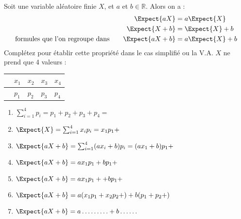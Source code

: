 \documentclass[main.tex]{subfiles}
\begin{document}
\begin{exercise} Soit une variable aléatoire finie $X$, et $a$ et $b\in\mathbb{R}$. Alors on a :
	\setlength{\abovedisplayskip}{3pt}
	\setlength{\belowdisplayskip}{3pt}  
	\begin{align*}
		\Expect{aX}&=a\Expect{X}\\
		\Expect{X+b}&=\Expect{X}+b \\
		\text{formules que l'on regroupe dans}\qquad \Expect{aX+b}&=a\Expect{X}+b
	\end{align*}
	Complétez pour établir cette propriété dans le cas simplifié ou la V.A. $X$ ne prend que 4 valeurs :\\
	\renewcommand{\arraystretch}{1.25} 
	\null	\hfill \begin{tabularx}{0.7\linewidth}{|c|Y|Y|Y|Y|}
		\hline
		 & $x_1$ & $x_2$ & $x_3$ & $x_4$ \\ \hline
		 & $p_1$ & $p_2$  & $p_3$  & $p_4$  \\\hline
	\end{tabularx} 
	\hfill \null
	\begin{spacing}{2}
		\begin{enumerate}[label={},leftmargin=*]
			\item $\sum_{i=1}^{4}p_i=p_1+p_2+ p_3+p_4=$\dotfill
			\item $\Expect{X}=\sum_{i=1}^{4}x_ip_i=x_1p_1+\dotfill $
			\item $\Expect{aX+b}=\sum_{i=1}^{4}(ax_i+b)p_i=(ax_1+b)p_1+\dotfill $
			\item  $\Expect{aX+b}=ax_1p_1 + bp_1+\dotfill $
			\item $\Expect{aX+b}=ax_1p_1 + \dotfill + bp_1+\dotfill $
			\item $\Expect{aX+b}=a(x_1p_1+x_2p_2+\dotfill) + b(p_1+p_2+\dotfill) $
			\item $\Expect{aX+b}=a\ldots\ldots\ldots+ b \ldots\ldots $ 
		\end{enumerate}
	\end{spacing}
\end{exercise}
\end{document}
